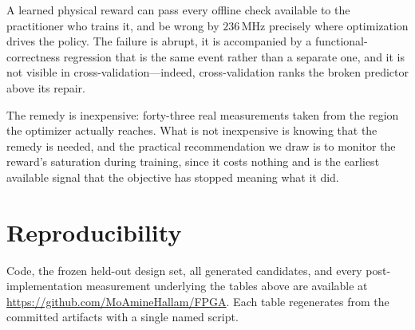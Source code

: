 \documentclass[journal]{IEEEtran}
\begin{document}
A learned physical reward can pass every offline check available to the
practitioner who trains it, and be wrong by $236$\,MHz precisely where
optimization drives the policy. The failure is abrupt, it is accompanied by a
functional-correctness regression that is the same event rather than a separate
one, and it is not visible in cross-validation---indeed, cross-validation ranks
the broken predictor above its repair.

The remedy is inexpensive: forty-three real measurements taken from the region
the optimizer actually reaches. What is not inexpensive is knowing that the
remedy is needed, and the practical recommendation we draw is to monitor the
reward's saturation during training, since it costs nothing and is the earliest
available signal that the objective has stopped meaning what it did.

\section*{Reproducibility}

Code, the frozen held-out design set, all generated candidates, and every
post-implementation measurement underlying the tables above are available at
\url{https://github.com/MoAmineHallam/FPGA}. Each table regenerates from the
committed artifacts with a single named script.



\end{document}
